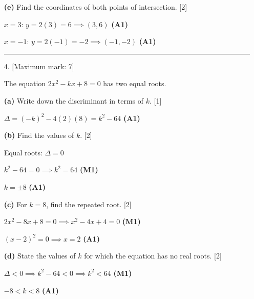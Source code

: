 \documentclass[12pt, twoside]{article}
\begin{document}
\begin{enumerate}[itemsep=0.3cm]
\medskip

\textbf{(e)} Find the coordinates of both points
of intersection. \hfill [2]

$x = 3$: $y = 2(3) = 6 \implies (3, 6)$ \hfill \textbf{(A1)}

$x = -1$: $y = 2(-1) = -2 \implies (-1, -2)$ \hfill \textbf{(A1)}

\bigskip
\hrule
\bigskip

\item[4.] [Maximum mark: 7]

The equation $2x^2 - kx + 8 = 0$ has two equal roots.

\medskip

\textbf{(a)} Write down the discriminant in terms of $k$. \hfill [1]

$\Delta = (-k)^2 - 4(2)(8) = k^2 - 64$ \hfill \textbf{(A1)}

\medskip

\textbf{(b)} Find the values of $k$. \hfill [2]

Equal roots: $\Delta = 0$

$k^2 - 64 = 0 \implies k^2 = 64$ \hfill \textbf{(M1)}

$k = \pm 8$ \hfill \textbf{(A1)}

\medskip

\textbf{(c)} For $k = 8$, find the repeated root. \hfill [2]

$2x^2 - 8x + 8 = 0 \implies x^2 - 4x + 4 = 0$ \hfill \textbf{(M1)}

$(x - 2)^2 = 0 \implies x = 2$ \hfill \textbf{(A1)}

\medskip

\textbf{(d)} State the values of $k$ for which the equation
has no real roots. \hfill [2]

$\Delta < 0 \implies k^2 - 64 < 0 \implies k^2 < 64$ \hfill \textbf{(M1)}

$-8 < k < 8$ \hfill \textbf{(A1)}

\end{enumerate}
\end{document}
